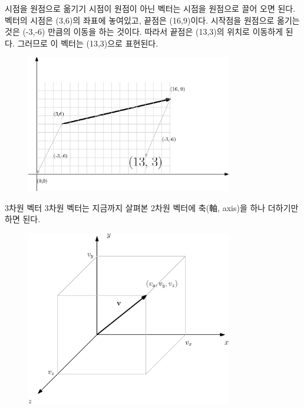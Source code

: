 \begin{frame}{시점을 원점으로 옮기기}
시점이 원점이 아닌 벡터는 시점을 원점으로 끌어 오면 된다.
벡터의 시점은 (3,6)의 좌표에 놓여있고, 끝점은 (16,9)이다. 시작점을 원점으로 옮기는 것은 (-3,-6) 만큼의 이동을 하는 것이다.
따라서 끝점은 (13,3)의 위치로 이동하게 된다. 그러므로 이 벡터는 (13,3)으로 표현된다.

\begin{figure}
\includegraphics[width=9cm]{Math_vector/vectorMove.eps}
\end{figure}

\end{frame}

\begin{frame}{3차원 벡터}
3차원 벡터는 지금까지 살펴본 2차원 벡터에 축(軸, axis)을 하나 더하기만 하면 된다.
\begin{figure}
\includegraphics[width=9cm]{Math_vector/3dVector.eps}
\end{figure}
\end{frame}


